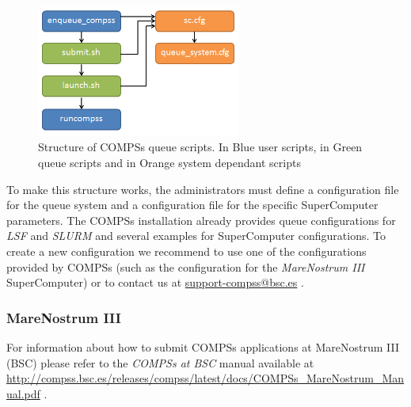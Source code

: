 \begin{figure}[h!]
  \centering
    \includegraphics[width=0.6\textwidth]{./Sections/5_Execution_Platforms/Figures/queue_scripts_structure.png}
    \caption{Structure of COMPSs queue scripts. In Blue user scripts, in Green queue scripts and in Orange system dependant scripts}
    \label{fig:queue_scripts_structure}
\end{figure}

To make this structure works, the administrators must define a configuration file for the queue system and a configuration file
for the specific SuperComputer parameters. The COMPSs installation already provides queue configurations for \textit{LSF} and 
\textit{SLURM} and several examples for SuperComputer configurations. 
To create a new configuration we recommend to use one of the configurations provided by COMPSs (such as the configuration for the
\textit{MareNostrum III} SuperComputer) or to contact us at \url{support-compss@bsc.es} .

\subsubsection{MareNostrum III}

For information about how to submit COMPSs applications at MareNostrum III (BSC) please refer to the \textit{COMPSs at BSC} manual 
available at \url{http://compss.bsc.es/releases/compss/latest/docs/COMPSs_MareNostrum_Manual.pdf} .
